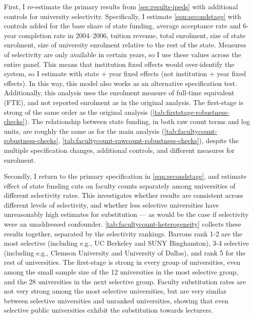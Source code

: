 First, I re-estimate the primary results from \autoref{sec:results-ipeds} with additional controls for university selectivity.
Specifically, I estimate \autoref{eqn:secondstage} with controls added for the base share of state funding, average acceptance rate and 6-year completion rate  in 2004--2006, tuition revenue, total enrolment, size of state enrolment, size of university enrolment relative to the rest of the state.
Measures of selectivity are only available in certain years, so I use these values across the entire panel.
This means that institution fixed effects would over-identify the system, so I estimate with state $+$ year fixed effects (not institution $+$ year fixed effects).
In this way, this model also works as an alternative specification test.
Additionally, this analysis uses the enrolment measure of full-time equivalent (FTE), and not reported enrolment as in the original analysis.
The first-stage is strong of the same order as the original analysis (\autoref{tab:firststage-robustness-checks}).
The relationship between state funding, in both raw count terms and log units, are roughly the same as for the main analysis (\autoref{tab:facultycount-robustness-checks}, \ref{tab:facultycount-rawcount-robustness-checks}), despite the multiple specification changes, additional controls, and different measures for enrolment.

Secondly, I return to the primary specification in \autoref{eqn:secondstage}, and estimate effect of state funding cuts on faculty counts separately among universities of different selectivity rates.
This investigates whether results are consistent across different levels of selectivity, and whether less selective universities have unreasonably high estimates for substitution --- as would be the case if selectivity were an unaddressed confounder.
\autoref{tab:facultycount-heterogeneity} collects these results together, separated by the \cite{barrons2009} selectivity rankings.
Barrons rank 1-2 are the most selective (including e.g., UC Berkeley and SUNY Binghamton), 3-4 selective (including e.g., Clemson University and University of Dallas), and rank 5 for the rest of universities.
The first-stage is strong in every group of universities, even among the small sample size of the 12 universities in the most selective group, and the 28 universities in the next selective group.
Faculty substitution rates are not very strong among the most selective universities, but are very similar between selective universities and unranked universities, showing that even selective public universities exhibit the substitution towards lecturers.

